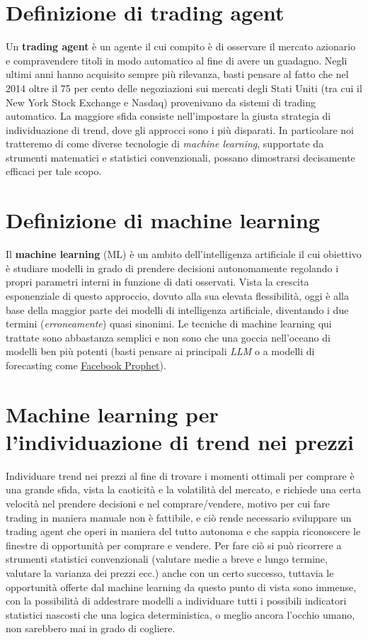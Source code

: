 \documentclass[binding=0.6cm]{sapthesis}
\begin{document}
		\section{Definizione di trading agent}
			Un \textbf{trading agent} è un agente il cui compito è di osservare il mercato azionario e compravendere titoli in modo automatico al fine di avere un guadagno. Negli ultimi anni hanno
			acquisito sempre più rilevanza, basti pensare al fatto che nel 2014 oltre il 75 per cento delle negoziazioni sui mercati degli Stati Uniti (tra cui il New York Stock Exchange e Nasdaq)
			provenivano da sistemi di trading automatico. La maggiore sfida consiste nell'impostare la giusta strategia di individuazione di trend, dove gli approcci sono i più disparati. In particolare
			noi tratteremo di come diverse tecnologie di \textit{machine learning}, supportate da strumenti matematici e statistici convenzionali, possano dimostrarsi decisamente efficaci per tale scopo.
		\section{Definizione di machine learning}
			Il \textbf{machine learning} (ML) è un ambito dell'intelligenza artificiale il cui obiettivo è studiare modelli in grado di prendere decisioni autonomamente regolando i propri parametri interni
			in funzione di dati osservati. Vista la crescita esponenziale di questo approccio, dovuto alla sua elevata flessibilità, oggi è alla base della maggior parte dei modelli di intelligenza
			artificiale, diventando i due termini (\textit{erroneamente}) quasi sinonimi. Le tecniche di machine learning qui trattate sono abbastanza semplici e non sono che una goccia nell'oceano di
			modelli ben più potenti (basti pensare ai principali \textit{LLM} o a modelli di forecasting come \underline{\href{https://facebook.github.io/prophet/}{Facebook Prophet}}).
		\section{Machine learning per l'individuazione di trend nei prezzi}
			Individuare trend nei prezzi al fine di trovare i momenti ottimali per comprare è una grande sfida, vista la caoticità e la volatilità del mercato, e richiede una certa velocità nel prendere
			decisioni e nel comprare/vendere, motivo per cui fare trading in maniera manuale non è fattibile, e ciò rende necessario sviluppare un trading agent che operi in maniera del tutto autonoma e
			che sappia riconoscere le finestre di opportunità per comprare e vendere. Per fare ciò si può ricorrere a strumenti statistici convenzionali (valutare medie a breve e lungo termine, valutare la
			varianza dei prezzi ecc.) anche con un certo successo, tuttavia le opportunità offerte dal machine learning da questo punto di vista sono immense, con la possibilità di addestrare modelli a
			individuare tutti i possibili indicatori statistici nascosti che una logica deterministica, o meglio ancora l'occhio umano, non sarebbero mai in grado di cogliere.
\end{document}
